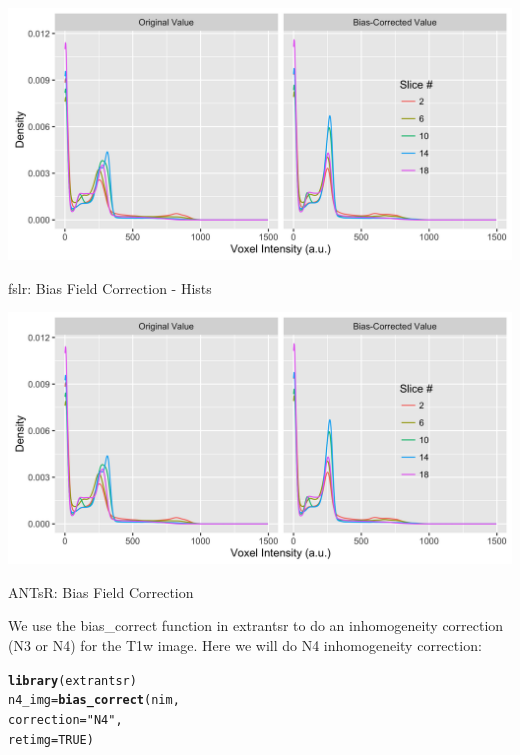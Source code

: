 \documentclass[11pt]{beamer}\usepackage[]{graphicx}\usepackage[]{color}
\makeatletter
\newcommand{\hlnum}[1]{\textcolor[rgb]{0.686,0.059,0.569}{#1}}%
\newcommand{\hlstr}[1]{\textcolor[rgb]{0.192,0.494,0.8}{#1}}%
\newcommand{\hlstd}[1]{\textcolor[rgb]{0.345,0.345,0.345}{#1}}%
\newcommand{\hlkwb}[1]{\textcolor[rgb]{0.69,0.353,0.396}{#1}}%
\newcommand{\hlkwc}[1]{\textcolor[rgb]{0.333,0.667,0.333}{#1}}%
\newcommand{\hlkwd}[1]{\textcolor[rgb]{0.737,0.353,0.396}{\textbf{#1}}}%
\newenvironment{kframe}{%
 \def\at@end@of@kframe{}%
 \ifinner\ifhmode%
  \def\at@end@of@kframe{\end{minipage}}%
  \begin{minipage}{\columnwidth}%
 \fi\fi%
 \def\FrameCommand##1{\hskip\@totalleftmargin \hskip-\fboxsep
 \colorbox{shadecolor}{##1}\hskip-\fboxsep
     \hskip-\linewidth \hskip-\@totalleftmargin \hskip\columnwidth}%
 \MakeFramed {\advance\hsize-\width
   \@totalleftmargin\z@ \linewidth\hsize
   \@setminipage}}%
 {\par\unskip\endMakeFramed%
 \at@end@of@kframe}
\newenvironment{knitrout}{}{} %
\makeatother
\begin{document}
\begin{knitrout}
\color{fgcolor}
\includegraphics[width=\textwidth,height=0.5\textheight,keepaspectratio]{figure/hist_plot_n4-1} 

\end{knitrout}


\begin{frame}[fragile]{fslr: Bias Field Correction - Hists}

\includegraphics[width=\linewidth]{figure/hist_plot_n4-1.png}


\end{frame}



\begin{frame}[fragile]{ANTsR: Bias Field Correction}

We use the bias\_correct function in extrantsr to do an inhomogeneity correction (N3 or N4) for  the T1w image.  Here we will do N4 inhomogeneity correction:

\begin{knitrout}
\color{fgcolor}\begin{kframe}
\begin{alltt}
\hlkwd{library}\hlstd{(extrantsr)}
\hlstd{n4_img} \hlkwb{=} \hlkwd{bias_correct}\hlstd{(nim,}
                      \hlkwc{correction} \hlstd{=} \hlstr{"N4"}\hlstd{,}
                      \hlkwc{retimg}\hlstd{=}\hlnum{TRUE}\hlstd{)}
\end{alltt}
\end{kframe}
\end{knitrout}
\end{frame}
\end{document}

